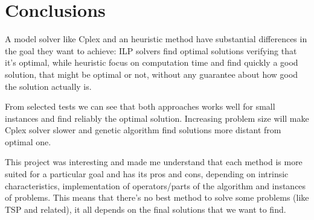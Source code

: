 \section{Conclusions}
	A model solver like Cplex and an heuristic method have substantial differences in the goal they want to achieve: ILP solvers find optimal solutions verifying that it's optimal, while heuristic focus on computation time and find quickly a good solution, that might be optimal or not, without any guarantee about how good the solution actually is.
	
	From selected tests we can see that both approaches works well for small instances and find reliably the optimal solution. Increasing problem size will make Cplex solver slower and genetic algorithm find solutions more distant from optimal one.
	
	This project was interesting and made me understand that each method is more suited for a particular goal and has its pros and cons, depending on intrinsic characteristics, implementation of operators/parts of the algorithm and instances of problems. This means that there's no best method to solve some problems (like TSP and related), it all depends on the final solutions that we want to find.